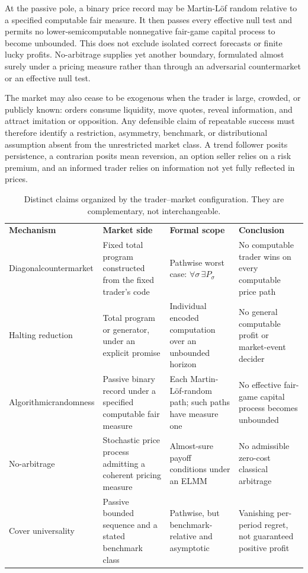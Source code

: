\documentclass[aps,pra,reprint,superscriptaddress,amsmath,amssymb,floatfix]{revtex4-2}
\theoremstyle{plain}
\theoremstyle{definition}
\theoremstyle{remark}
\begin{document}
At the passive pole, a binary price record may be Martin-L\"of random relative
to a specified computable fair measure. It then passes every effective null
test and permits no lower-semicomputable nonnegative fair-game capital process
to become unbounded. This does not exclude isolated correct forecasts or
finite lucky profits. No-arbitrage supplies yet another boundary, formulated
almost surely under a pricing measure rather than through an adversarial
countermarket or an effective null test.

The market may also cease to be exogenous when the trader is large, crowded,
or publicly known: orders consume liquidity, move quotes, reveal information,
and attract imitation or opposition. Any defensible claim of repeatable
success must therefore identify a restriction, asymmetry, benchmark, or
distributional assumption absent from the unrestricted market class. A trend
follower posits persistence, a contrarian posits mean reversion, an option
seller relies on a risk premium, and an informed trader relies on information
not yet fully reflected in prices.

\begin{table}[t]
\caption{\label{tab:claimmap}Distinct claims organized by the trader--market
configuration. They are complementary, not interchangeable.}
\centering
\begin{ruledtabular}
\begin{tabular}{p{}p{}p{}p{}}
\textbf{Mechanism} & \textbf{Market side} & \textbf{Formal scope}
& \textbf{Conclusion} \\
\colrule
Diagonal\newline\mbox{countermarket}
& Fixed total program constructed from the fixed trader's code
& Pathwise worst case:
\(\forall\sigma\,\exists P_\sigma\)
& No computable trader wins on every computable price path \\
Halting reduction
& Total program or generator, under an explicit promise
& Individual encoded computation over an unbounded horizon
& No general computable profit or market-event decider \\
Algorithmic\newline randomness
& Passive binary record under a specified computable fair measure
& Each Martin-L\"of-random path; such paths have measure one
& No effective fair-game capital process becomes unbounded \\
No-arbitrage
& Stochastic price process admitting a coherent pricing measure
& Almost-sure payoff conditions under an ELMM
& No admissible zero-cost classical arbitrage \\
Cover universality
& Passive bounded sequence and a stated benchmark class
& Pathwise, but benchmark-relative and asymptotic
& Vanishing per-period regret, not guaranteed positive profit \\
\end{tabular}
\end{ruledtabular}
\end{table}
\end{document}
